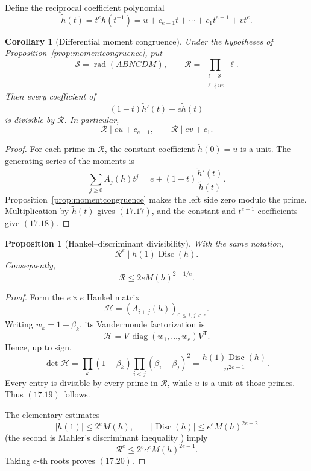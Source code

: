 \documentclass[11pt]{article}
\newtheorem{proposition}[theorem]{Proposition}
\newtheorem{corollary}[theorem]{Corollary}
\theoremstyle{definition}
\newcommand{\Disc}{\operatorname{Disc}}
\begin{document}
Define the reciprocal coefficient polynomial
\[
 \widetilde h(t)=t^eh(t^{-1})
 =u+c_{e-1}t+\cdots+c_1t^{e-1}+vt^e.
\]

\begin{corollary}[Differential moment congruence]
\label{cor:momentdifferential}
Under the hypotheses of Proposition~\ref{prop:momentcongruence}, put
\[
 \mathcal S=\operatorname{rad}(ABNCDM),
 \qquad
 \mathcal R=\prod_{\substack{\ell\mid\mathcal S\\ \ell\nmid uv}}\ell.
\]
Then every coefficient of
\begin{equation}
 (1-t)\widetilde h'(t)+e\widetilde h(t)
 \tag{17.17}
\end{equation}
is divisible by \(\mathcal R\).  In particular,
\begin{equation}
 \mathcal R\mid eu+c_{e-1},
 \qquad
 \mathcal R\mid ev+c_1.
 \tag{17.18}
\end{equation}
\end{corollary}

\begin{proof}
For each prime in \(\mathcal R\), the constant coefficient
\(\widetilde h(0)=u\) is a unit.  The generating series of the moments is
\[
 \sum_{j\geq0}A_j(h)t^j
 =e+(1-t)\frac{\widetilde h'(t)}{\widetilde h(t)}.
\]
Proposition~\ref{prop:momentcongruence} makes the left side zero modulo the
prime.  Multiplication by \(\widetilde h(t)\) gives \((17.17)\), and the
constant and \(t^{e-1}\) coefficients give \((17.18)\).
\end{proof}

\begin{proposition}[Hankel--discriminant divisibility]
\label{prop:hankeldisc}
With the same notation,
\begin{equation}
 \boxed{\mathcal R^e\mid h(1)\Disc(h).}
 \tag{17.19}
\end{equation}
Consequently,
\begin{equation}
 \mathcal R\leq2eM(h)^{2-1/e}.
 \tag{17.20}
\end{equation}
\end{proposition}

\begin{proof}
Form the \(e\times e\) Hankel matrix
\[
 \mathcal H=(A_{i+j}(h))_{0\leq i,j<e}.
\]
Writing \(w_k=1-\beta_k\), its Vandermonde factorization is
\[
 \mathcal H=V\,\operatorname{diag}(w_1,\ldots,w_e)V^{\mathsf T}.
\]
Hence, up to sign,
\begin{equation}
 \det\mathcal H
 =\prod_k(1-\beta_k)
  \prod_{i<j}(\beta_i-\beta_j)^2
 =\frac{h(1)\Disc(h)}{u^{2e-1}}.
 \tag{17.21}
\end{equation}
Every entry is divisible by every prime in \(\mathcal R\), while \(u\) is a
unit at those primes.  Thus \((17.19)\) follows.

The elementary estimates
\[
 |h(1)|\leq2^eM(h),
 \qquad
 |\Disc(h)|\leq e^eM(h)^{2e-2}
\]
(the second is Mahler's discriminant inequality \cite{Mahler1964}) imply
\[
 \mathcal R^e
 \leq2^ee^eM(h)^{2e-1}.
\]
Taking \(e\)-th roots proves \((17.20)\).
\end{proof}
\end{document}
